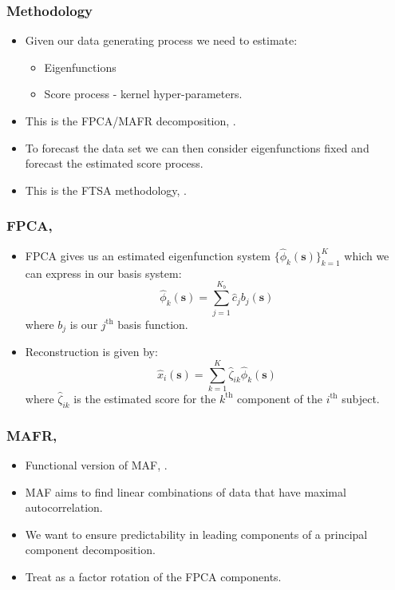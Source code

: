 \documentclass[aspectratio=169]{beamer}
\newcommand{\ve}[1]{\bm{{#1}}}
\begin{document}
  \begin{frame}
    \frametitle{Methodology}
    \begin{itemize}
      \item Given our data generating process we need to estimate:
        \begin{itemize}
          \item Eigenfunctions
          \item Score process - kernel hyper-parameters.
        \end{itemize}
      \item This is the FPCA/MAFR decomposition, \cite{ramsay_functional_2010, hooker_maximal_2016}. 
      \item To forecast the data set we can then consider eigenfunctions fixed and forecast the estimated score process. 
      \item This is the FTSA methodology, \cite{shang_ftsa_2013}.
    \end{itemize}
  \end{frame}

  \begin{frame}
    \frametitle{FPCA, \cite{ramsay_functional_2010}}
      \begin{itemize}
        \item FPCA gives us an estimated eigenfunction system $\{\hat{\phi}_k(\ve{s})\}_{k=1}^K$ which we can express in our basis system:
          \begin{equation}
            \hat{\phi}_k(\ve{s}) = \sum_{j=1}^{K_b}\hat{c}_j b_j(\ve{s})
            \label{eqn:basis_ef}
          \end{equation}
          where $b_j$ is our $j^\text{th}$ basis function.
        \item Reconstruction is given by:
          \begin{equation}
            \hat{x}_i(\ve{s}) = \sum_{k=1}^K \hat{\zeta}_{ik} \hat{\phi}_k(\ve{s})
            \label{eqn:fpca}
          \end{equation}
          where $\hat{\zeta}_{ik}$ is the estimated score for the $k^\text{th}$ component of the $i^\text{th}$ subject.
      \end{itemize}
  \end{frame}

  \begin{frame}
    \frametitle{MAFR, \cite{hooker_maximal_2016}}
      \begin{itemize}
        \item Functional version of MAF, \cite{switzer_minmax_1984}.
        \item MAF aims to find linear combinations of data that have maximal autocorrelation. 
        \item We want to ensure predictability in leading components of a principal component decomposition.
        \item Treat as a factor rotation of the FPCA components. 
      \end{itemize}
  \end{frame}
  
\end{document}
